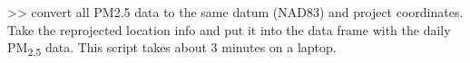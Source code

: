 \begin{enumerate}[nolistsep]
\begin{enumerate}[nolistsep]
	\end{enumerate}

 >> convert all PM2.5 data to the same datum (NAD83) and project coordinates. Take the reprojected location info and put it into the data frame with the daily PM\textsubscript{2.5} data. This script takes about 3 minutes on a laptop.





\end{enumerate}
